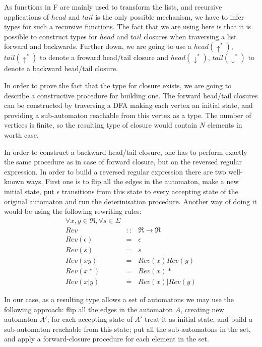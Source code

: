 \documentclass{article}
\begin{document}
As functions in F are mainly used to transform the lists, and
recursive applications of $head$ and $tail$ is the only possible
mechanism, we have to infer types for such a recursive functions.
The fact that we are using here is that it is possible to construct
types for $head$ and $tail$ closures when traversing a list forward
and backwards.  Further down, we are going to use a $head (\uparrow ^*)$,
$tail (\uparrow ^*)$ to denote a froward head/tail closure and 
$head (\downarrow ^*)$, $tail (\downarrow ^*)$ to denote a backward
head/tail closure.

In order to prove the fact that the type for closure exists, we are
going to describe a constructive procedure for building one.  The
forward head/tail closures can be constructed by traversing a
DFA making each vertex an initial state, and providing a sub-automaton
reachable from this vertex as a type.  The number of vertices is finite,
so the resulting type of closure would contain $N$ elements in worth
case.

In order to construct a backward head/tail closure, one has to perform
exactly the same procedure as in case of forward closure, but on the
reversed regular expression.  In order to build a reversed regular
expression there are two well-known ways.  First one is to flip all the
edges in the automaton, make a new initial state, put $\epsilon$
transitions from this state to every accepting state of the original
automaton and run the deterinisation procedure.  Another way of doing
it would be using the following rewriting rules:
\begin{eqnarray}
   \forall x, y \in \Re, \forall s \in \Sigma \\ 
   Rev &::& \Re \to \Re \\
   Rev (\epsilon) &=& \epsilon \\
   Rev (s) &=& s \\
   Rev (xy) &=& Rev (x) Rev (y) \\
   Rev (x*) &=& Rev (x)* \\
   Rev (x|y) &=& Rev (x) | Rev (y) 
\end{eqnarray}

\noindent
In our case, as a resulting type allows a set of automatons we may
use the following approach: flip all the edges in the automaton $A$,
creating new automaton $A'$; for each accepting state of $A'$ treat
it as initial state, and build a sub-automaton reachable from this
state; put all the sub-automatons in the set, and apply a
forward-closure procedure for each element in the set.
\end{document}

